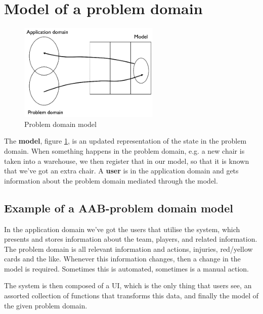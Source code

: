 \section{Model of a problem domain}
\begin{figure}
    \centering
    \includegraphics[width=0.6\textwidth]{figures/problemdomain.png}
    \caption{Problem domain model}
    \label{fig:problemdomainmodel}
\end{figure}

The \textbf{model}, figure \ref{fig:problemdomainmodel}, is an updated representation of the state in the problem domain. When something happens in the problem domain, e.g. a new chair is taken into a warehouse, we then register that in our model, so that it is known that we've got an extra chair. A \textbf{user} is in the application domain and gets information about the problem domain mediated through the model. 

\subsection{Example of a AAB-problem domain model}
In the application domain we've got the users that utilise the system, which presents and stores information about the team, players, and related information. The problem domain is all relevant information and actions, injuries, red/yellow cards and the like. Whenever this information changes, then a change in the model is required. Sometimes this is automated, sometimes is a manual action.

The system is then composed of a UI, which is the only thing that users see, an assorted collection of functions that transforms this data, and finally the model of the given problem domain.

